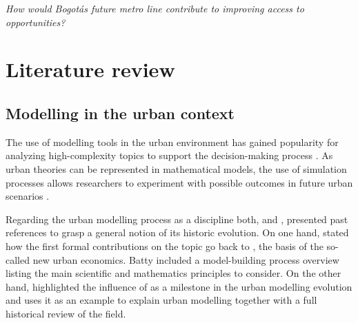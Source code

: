 \documentclass[12pt, a4paper]{report}
\begin{document}



\begin{center}
    \textit{How would Bogot\'{a}\textquotesingle s future metro line contribute to improving access to opportunities?} 
\end{center}





\chapter{Literature review} \label{Chap2}

\section{Modelling in the urban context}

The use of modelling tools in the urban environment has gained popularity for analyzing high-complexity topics to support the decision-making process \citep{houApproachBuildingOccupancy2020}. As urban theories can be represented in mathematical models, the use of simulation processes allows researchers to experiment with possible outcomes in future urban scenarios \citep{battyUrbanModeling2009a}.

Regarding the urban modelling process as a discipline both, \cite{battyUrbanModeling2009a} and \cite{wilsonFutureUrbanModelling2018}, presented past references to grasp a general notion of its historic evolution. On one hand, \cite{battyUrbanModeling2009a} stated how the first formal contributions on the topic go back to \cite{alonsoLocationLandUse1964}, the basis of the so-called new urban economics. Batty included a model-building process overview listing the main scientific and mathematics principles to consider. On the other hand, \cite{wilsonScienceCitiesRegions2012} highlighted the influence of \cite{lowryModelMetropolis1964} as a milestone in the urban modelling evolution and uses it as an example to explain urban modelling together with a full historical review of the field.
\end{document}
